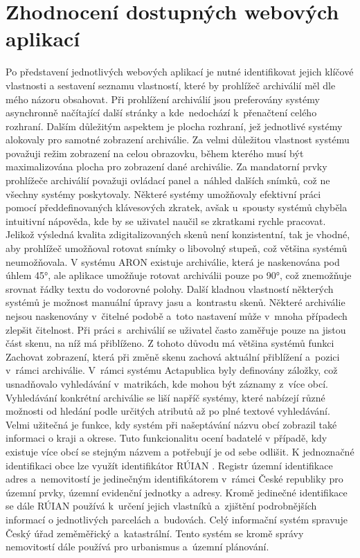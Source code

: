 \section{Zhodnocení dostupných webových aplikací}
Po představení jednotlivých webových aplikací je nutné identifikovat jejich klíčové vlastnosti a sestavení seznamu vlastností, které by prohlížeč archiválií měl dle mého názoru obsahovat. Při prohlížení archiválií jsou preferovány systémy asynchronně načítající další stránky a kde~nedochází k~přenačtení celého rozhraní. Dalším důležitým aspektem je plocha rozhraní, jež jednotlivé systémy alokovaly pro samotné zobrazení archiválie. Za velmi důležitou vlastnost systému považuji režim zobrazení na celou obrazovku, během kterého musí být maximalizována plocha pro zobrazení dané archiválie.
\newpara
Za mandatorní prvky prohlížeče archiválií považuji ovládací panel a~náhled dalších snímků, což ne všechny systémy poskytovaly. Některé systémy umožňovaly efektivní práci pomocí předdefinovaných klávesových zkratek, avšak u~spousty systémů chyběla intuitivní nápověda, kde by se uživatel naučil se zkratkami rychle pracovat.
\newpara
Jelikož výsledná kvalita zdigitalizovaných skenů není konzistentní, tak je vhodné, aby prohlížeč umožňoval rotovat snímky o libovolný stupeň, což většina systémů neumožňovala. V systému ARON existuje archiválie, která je naskenována pod úhlem 45°, ale aplikace umožňuje rotovat archiválii pouze po 90°, což znemožňuje srovnat řádky textu do vodorovné polohy. Další kladnou vlastností některých systémů je možnost manuální úpravy jasu a~kontrastu skenů. Některé archiválie nejsou naskenovány v~čitelné podobě a~toto nastavení může v~mnoha případech zlepšit čitelnost. Při práci s~archiválií se uživatel často zaměřuje pouze na jistou část skenu, na níž má přiblíženo. Z tohoto důvodu má většina systémů funkci Zachovat zobrazení, která při změně skenu zachová aktuální přiblížení a~pozici v~rámci archiválie. V~rámci systému Actapublica byly definovány záložky, což usnadňovalo vyhledávání v~matrikách, kde mohou být záznamy z~více obcí. 
\newpara
Vyhledávání konkrétní archiválie se liší napříč systémy, které nabízejí různé možnosti od hledání podle určitých atributů až po plné textové vyhledávání. Velmi užitečná je funkce, kdy systém při našeptávání názvu obcí zobrazil také informaci o kraji a okrese. Tuto funkcionalitu ocení badatelé v případě, kdy existuje více obcí se stejným názvem a potřebují je od sebe odlišit.
\newpara
K jednoznačné identifikaci obce lze využít identifikátor RÚIAN \cite{coToJeRuian}. Registr územní identifikace adres a~nemovitostí je jedinečným identifikátorem v~rámci České republiky pro územní prvky, územní evidenční jednotky a adresy. Kromě jedinečné identifikace se dále RÚIAN používá k~určení jejich vlastníků a~zjištění podrobnějších informací o jednotlivých parcelách a~budovách. Celý informační systém spravuje Český úřad zeměměřický a~katastrální. Tento systém se kromě správy nemovitostí dále používá pro urbanismus a~územní plánování.
